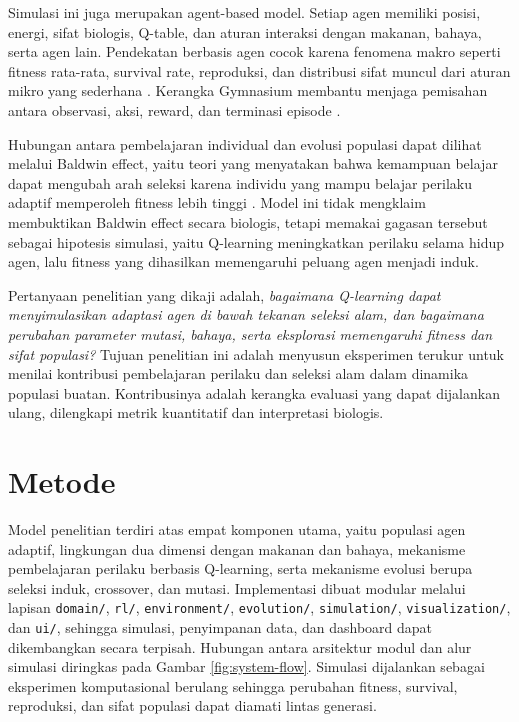 \documentclass[10pt]{article}
\begin{document}
Simulasi ini juga merupakan agent-based model. Setiap agen memiliki posisi, energi, sifat biologis, Q-table, dan aturan interaksi dengan makanan, bahaya, serta agen lain. Pendekatan berbasis agen cocok karena fenomena makro seperti fitness rata-rata, survival rate, reproduksi, dan distribusi sifat muncul dari aturan mikro yang sederhana \citep{gilbert2008agent}. Kerangka Gymnasium membantu menjaga pemisahan antara observasi, aksi, reward, dan terminasi episode \citep{towers2024gymnasium}.

Hubungan antara pembelajaran individual dan evolusi populasi dapat dilihat melalui Baldwin effect, yaitu teori yang menyatakan bahwa kemampuan belajar dapat mengubah arah seleksi karena individu yang mampu belajar perilaku adaptif memperoleh fitness lebih tinggi \citep{baldwin1896new,downing2012baldwin}. Model ini tidak mengklaim membuktikan Baldwin effect secara biologis, tetapi memakai gagasan tersebut sebagai hipotesis simulasi, yaitu Q-learning meningkatkan perilaku selama hidup agen, lalu fitness yang dihasilkan memengaruhi peluang agen menjadi induk.

Pertanyaan penelitian yang dikaji adalah, \textit{bagaimana Q-learning dapat menyimulasikan adaptasi agen di bawah tekanan seleksi alam, dan bagaimana perubahan parameter mutasi, bahaya, serta eksplorasi memengaruhi fitness dan sifat populasi?} Tujuan penelitian ini adalah menyusun eksperimen terukur untuk menilai kontribusi pembelajaran perilaku dan seleksi alam dalam dinamika populasi buatan. Kontribusinya adalah kerangka evaluasi yang dapat dijalankan ulang, dilengkapi metrik kuantitatif dan interpretasi biologis.

\section{Metode}
Model penelitian terdiri atas empat komponen utama, yaitu populasi agen adaptif, lingkungan dua dimensi dengan makanan dan bahaya, mekanisme pembelajaran perilaku berbasis Q-learning, serta mekanisme evolusi berupa seleksi induk, crossover, dan mutasi. Implementasi dibuat modular melalui lapisan \texttt{domain/}, \texttt{rl/}, \texttt{environment/}, \texttt{evolution/}, \texttt{simulation/}, \texttt{visualization/}, dan \texttt{ui/}, sehingga simulasi, penyimpanan data, dan dashboard dapat dikembangkan secara terpisah. Hubungan antara arsitektur modul dan alur simulasi diringkas pada Gambar \ref{fig:system-flow}. Simulasi dijalankan sebagai eksperimen komputasional berulang sehingga perubahan fitness, survival, reproduksi, dan sifat populasi dapat diamati lintas generasi.
\end{document}
